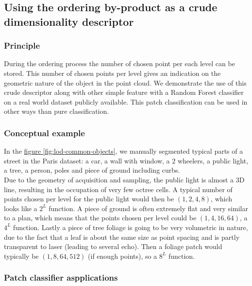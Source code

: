 	\subsection{Using the ordering by-product as a crude dimensionality descriptor}
	
	
		\label{method.dimdescriptor}
		\subsubsection{Principle}
			During the ordering process the number of chosen point per each level can be stored.
			This number of chosen points per level gives an indication on the geometric nature of the object in the point cloud. 
			We demonstrate the use of this crude descriptor along with other simple feature with a Random Forest classifier on a real world dataset publicly available. 
			This patch classification can be used in other ways than pure classification.
		
		\subsubsection{Conceptual example}
			
			In the \href{fig:lod-common-objects}{figure \ref{fig:lod-common-objects}}, we manually segmented typical parts of a street in the Paris dataset: a car, a wall with window, a 2 wheelers, a public light, a tree, a person, poles and piece of ground including curbs.
			\\
			Due to the geometry of acquisition and sampling, the public light is almost a 3D line, resulting in the occupation of very few octree cells.
			A typical number of points chosen per level  for the public light would then be $(1,2,4,8)$, which looks like a $2^L$ function.
			A piece of ground is often extremely flat and very similar to a plan, which means that the points chosen per level could be $(1,4,16,64)$, a $4^L$ function.
			Lastly a piece of tree foliage is going to be very volumetric in nature, due to the fact that a leaf is about the same size as point spacing and is partly transparent to laser (leading to several echo).
			Then a foliage patch would typically be $(1,8,64,512)$ (if enough points), so a $8^L$ function.
	
	 
			
		\subsubsection{Patch classifier aspplications}
		
